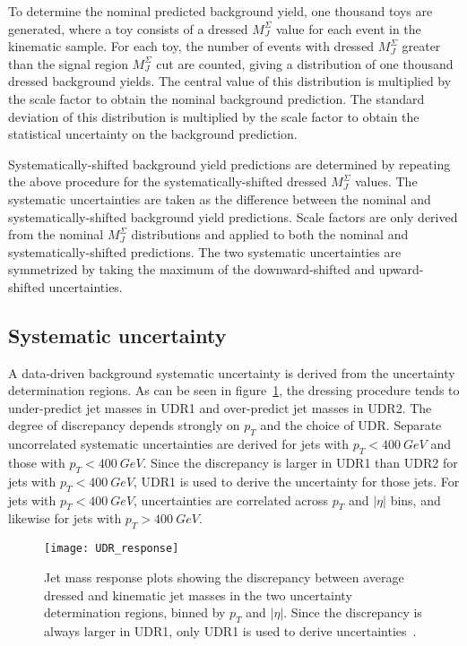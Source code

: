 To determine the nominal predicted background yield, one thousand toys are generated,
where a toy consists of a dressed $M_{J}^{\Sigma}$ value for each event in the kinematic sample.
For each toy, the number of events with dressed $M_{J}^{\Sigma}$ greater than the signal region $M_{J}^{\Sigma}$ cut are counted,
giving a distribution of one thousand dressed background yields.
The central value of this distribution is multiplied by the scale factor to obtain the nominal background prediction.
The standard deviation of this distribution is multiplied by the scale factor to obtain the statistical uncertainty on the background prediction.

Systematically-shifted background yield predictions are determined by repeating the above procedure for the systematically-shifted dressed $M_{J}^{\Sigma}$ values.
The systematic uncertainties are taken as the difference between the nominal and systematically-shifted background yield predictions.
Scale factors are only derived from the nominal $M_{J}^{\Sigma}$ distributions and applied to both the nominal and systematically-shifted predictions.
The two systematic uncertainties are symmetrized by taking the maximum of the \linebreak downward-shifted and upward-shifted uncertainties.

\subsection{Systematic uncertainty} \label{subsec:bkg_uncert}
A data-driven background systematic uncertainty is derived from the uncertainty determination regions.
As can be seen in figure~\ref{fig:udr_response}, the dressing procedure tends to under-predict jet masses in UDR1 and over-predict jet masses in UDR2.
The degree of discrepancy depends strongly on $p_T$ and the choice of UDR.
Separate uncorrelated systematic uncertainties are derived for jets with $p_T<400~GeV$ and those with $p_T<400~GeV$.
Since the discrepancy is larger in UDR1 than UDR2 for jets with $p_T<400~GeV$, UDR1 is used to derive the uncertainty for those jets.
For jets with $p_T<400~GeV$, uncertainties are correlated across $p_T$ and $|\eta|$ bins, and likewise for jets with $p_T>400~GeV$.

\begin{figure}[!ht]
    \centering
    \texttt{[image: UDR\_response]}
    \caption{Jet mass response plots showing the discrepancy between average dressed and kinematic jet masses in the two uncertainty
    determination regions, binned by $p_T$ and $|\eta|$.
    Since the discrepancy is always larger in UDR1, only UDR1 is used to derive uncertainties~\cite{paper-plb}.}
    \label{fig:udr_response}
\end{figure}

